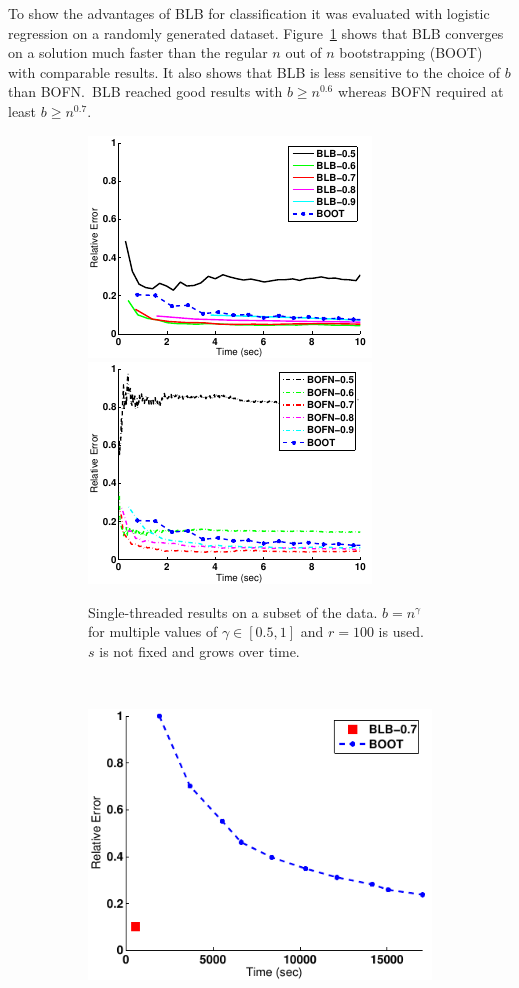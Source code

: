 To show the advantages of BLB for classification it was evaluated with logistic regression on a randomly generated dataset.
Figure~\ref{fig:blb:eval:single} shows that BLB converges on a solution much faster than the regular \(n\) out of \(n\) bootstrapping (BOOT) with comparable results.
It also shows that BLB is less sensitive to the choice of \(b\) than BOFN.\
BLB reached good results with \(b \geq n^{0.6}\) whereas BOFN required at least \(b \geq n^{0.7}\).
\begin{figure}[t]
	\begin{subfigure}[t]{0.66\textwidth}
		\centering
		\includegraphics[width=0.49\linewidth]{gfx/blb/time1.pdf}
		\includegraphics[width=0.49\linewidth]{gfx/blb/time2.pdf}
		\caption{
			Single-threaded results on a subset of the data.
			\(b = n^\gamma\) for multiple values of \(\gamma \in [0.5, 1]\) and \(r = 100\) is used.
			\(s\) is not fixed and grows over time.
		}\label{fig:blb:eval:single}
	\end{subfigure}
	\hfill\
	\begin{subfigure}[t]{0.32\textwidth}
		\centering
		\includegraphics[width=\linewidth]{gfx/blb/parallel.pdf}

\end{subfigure}
\end{figure}

